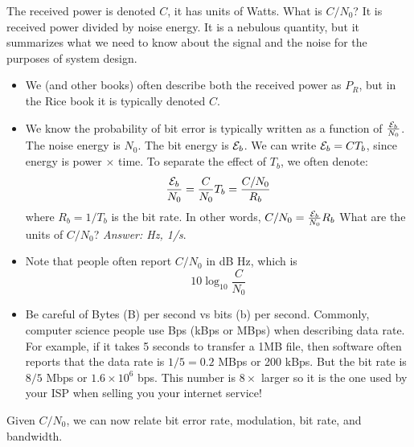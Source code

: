 The received power is denoted $C$, it has units of Watts.  What is $C/N_0$?  It is received power divided by noise energy.  It is a nebulous quantity, but it summarizes what we need to know about the signal and the noise for the purposes of system design.  
\begin{itemize}
%
 \item We (and other books) often describe both the received power as $P_R$, but in the Rice book it is typically denoted $C$.
%
 \item We know the probability of bit error is typically written as a function of $\frac{\mathcal{E}_b}{N_0}$.  The noise energy is $N_0$.  The bit energy is $\mathcal{E}_b$.  We can write $\mathcal{E}_b = C T_b$, since energy is power $\times$ time.
To separate the effect of $T_b$, we often denote:
\[
  \frac{\mathcal{E}_b}{N_0} = \frac{C}{N_0} T_b = \frac{C/N_0}{R_b}
\]
where $R_b = 1/T_b$ is the bit rate.  In other words, $C/N_0 = \frac{\mathcal{E}_b}{N_0}   R_b$   What are the units of $C/N_0$? {\it Answer: Hz, 1/s}.  
 \item Note that people often report $C/N_0$ in dB Hz, which is
  \[
    10 \log_{10} \frac{C}{N_0}
  \]
%
 \item Be careful of Bytes (B) per second vs bits (b) per second.  Commonly, computer science 
people use Bps (kBps or MBps) when describing data rate.  For
example, if it takes 5 seconds to transfer a 1MB file, then software
often reports that the data rate is $1/5=0.2$ MBps or 200 kBps. But
the bit rate is $8/5$ Mbps or $1.6\times 10^6$ bps.  This number is $8\times$ larger so it is the one used by your ISP when selling you your internet service!
%
\end{itemize}

Given $C/N_0$, we can now relate bit error rate, modulation, bit rate, and bandwidth.



